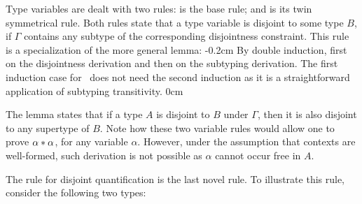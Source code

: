Type variables are dealt with two rules:
 is the base rule; and 
is its twin symmetrical rule. 
Both rules state that a type variable is disjoint to some type $B$, if $\Gamma$ contains any
subtype of the corresponding disjointness constraint. 
This rule is a specialization of the more general lemma:
{-0.2cm}
{By double induction, first on the disjointness derivation and then on the subtyping derivation.
The first induction case for~ does not need the second induction as it is 
a straightforward application of subtyping transitivity.}
{0cm}
%

The lemma states that if a type $A$ is disjoint to $B$ under $\Gamma$, then it is also disjoint
to any supertype of $B$. 
Note how these two variable rules would allow one to prove $\alpha * \alpha$, for any 
variable $\alpha$.
However, under the assumption that contexts are well-formed, such derivation is not possible 
as $\alpha$ cannot occur free in $A$. 

The rule for disjoint quantification  is the last novel rule. 
To illustrate this rule, consider the following two types:

